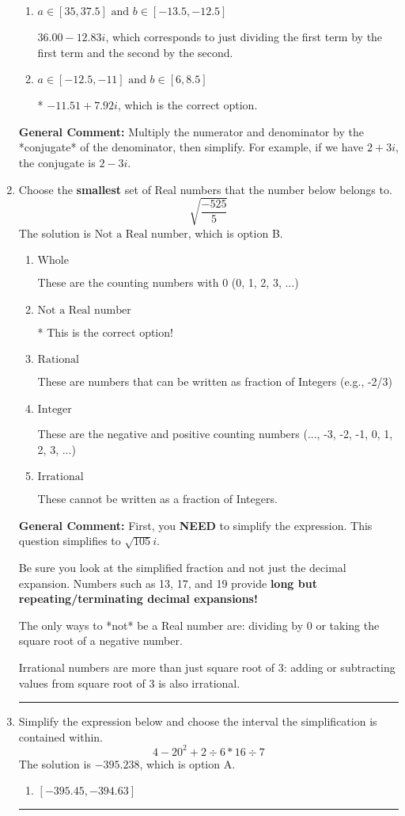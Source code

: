 \documentclass{extbook}[14pt]
\newcommand{\litem}[1]{\item #1

\rule{\textwidth}{0.4pt}}
\begin{document}
\begin{enumerate}
{\begin{enumerate}[label=\Alph*.]
 $-11.51  + 293.00 i$, which corresponds to forgetting to multiply the conjugate by the numerator.
\item \( a \in [35, 37.5] \text{ and } b \in [-13.5, -12.5] \)

 $36.00  - 12.83 i$, which corresponds to just dividing the first term by the first term and the second by the second.
\item \( a \in [-12.5, -11] \text{ and } b \in [6, 8.5] \)

* $-11.51  + 7.92 i$, which is the correct option.
\end{enumerate}

\textbf{General Comment:} Multiply the numerator and denominator by the *conjugate* of the denominator, then simplify. For example, if we have $2+3i$, the conjugate is $2-3i$.
}
\litem{
Choose the \textbf{smallest} set of Real numbers that the number below belongs to.
\[ \sqrt{\frac{-525}{5}} \]The solution is \( \text{Not a Real number} \), which is option B.\begin{enumerate}[label=\Alph*.]
\item \( \text{Whole} \)

These are the counting numbers with 0 (0, 1, 2, 3, ...)
\item \( \text{Not a Real number} \)

* This is the correct option!
\item \( \text{Rational} \)

These are numbers that can be written as fraction of Integers (e.g., -2/3)
\item \( \text{Integer} \)

These are the negative and positive counting numbers (..., -3, -2, -1, 0, 1, 2, 3, ...)
\item \( \text{Irrational} \)

These cannot be written as a fraction of Integers.
\end{enumerate}

\textbf{General Comment:} First, you \textbf{NEED} to simplify the expression. This question simplifies to $\sqrt{105} i$. 
 
 Be sure you look at the simplified fraction and not just the decimal expansion. Numbers such as 13, 17, and 19 provide \textbf{long but repeating/terminating decimal expansions!} 
 
 The only ways to *not* be a Real number are: dividing by 0 or taking the square root of a negative number. 
 
 Irrational numbers are more than just square root of 3: adding or subtracting values from square root of 3 is also irrational.
}
\litem{
Simplify the expression below and choose the interval the simplification is contained within.
\[ 4 - 20^2 + 2 \div 6 * 16 \div 7 \]The solution is \( -395.238 \), which is option A.\begin{enumerate}[label=\Alph*.]
\item \( [-395.45, -394.63] \)


\end{enumerate}}
\end{enumerate}
\end{document}
